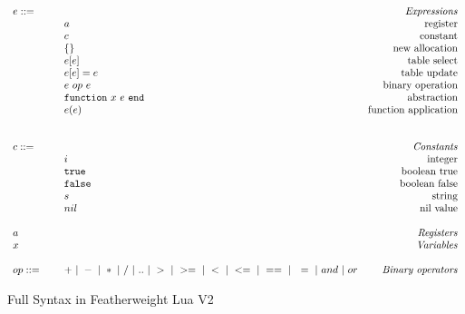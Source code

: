 \documentclass{article}
\begin{document}
\newcommand{\abFunction}[2]{{\tt function} ~{#1}~{#2}~{\tt end}}
\begin{figure}
\caption{Full Syntax in Featherweight Lua V2}
\label{fig:FW2Syx}
\[
  \begin{array}{llr}
  \mydefhead{e ::=\qquad\qquad\qquad\qquad}{Expressions}
  \mydefcase{a}{register}
  \mydefcase{c}{constant}
  \mydefcase{\{\}}{new allocation}
  \mydefcase{e[e]}{table select}
  \mydefcase{e[e] = e}{table update}
  \mydefcase{e ~op~ e}{binary operation}
  \mydefcase{\abFunction x e}{abstraction}
  \mydefcase{e(e)}{function application}
  \\
  \\
  \mydefhead{c ::=\qquad\qquad\qquad\qquad}{Constants}
  \mydefcase{i}{integer}
  \mydefcase{\tt true}{boolean true}
  \mydefcase{\tt false}{boolean false}
  \mydefcase{s}{string}
  \mydefcase{nil}{nil value}
  \\
  \mydefhead{a \qquad\qquad\qquad\qquad}{Registers}
  \mydefhead{x \qquad\qquad\qquad\qquad}{Variables}
  \\
  op ::= & + ~|~ - ~|~ * ~|~ / ~|~ .. ~|~ > ~|~ >= ~|~ < ~|~ <= ~|~ == ~|~ ~= ~|~ and ~|~ or & \mbox{\emph{Binary operators}} \\
\end{array}
\]
\end{figure}

\newcommand{\semanticFullRaw}[4]{{#1},{#2} \Downarrow {#3},{#4}}
\newcommand{\semanticFull}[4]{{#1},{#2} \Downarrow {#3}, {#4}}
\end{document}
